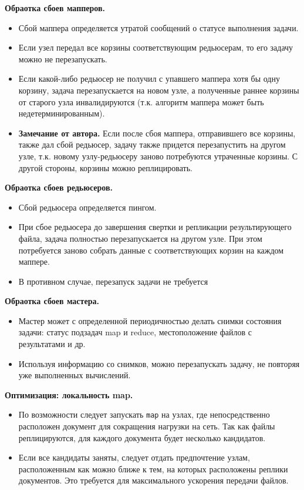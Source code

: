 \textbf{Обраотка сбоев мапперов.}
\begin{itemize}
  \item Сбой маппера определяется утратой сообщений о статусе выполнения задачи.
  \item Если узел передал все корзины соответствующим редьюсерам, то его задачу
    можно не перезапускать.
  \item Если какой-либо редьюсер не получил с упавшего маппера хотя бы одну
    корзину, задача перезапускается на новом узле, а полученные раннее корзины
    от старого узла инвалидируются (т.к. алгоритм маппера может быть
    недетерминированным).
  \item  \textbf{Замечание от автора.} Если после сбоя маппера, отправившего все
    корзины, также дал сбой редьюсер, задачу также придется перезапустить на
    другом узле, т.к. новому узлу-редьюсеру заново потребуются утраченные
    корзины. С другой стороны, корзины можно реплицировать.
\end{itemize}

\textbf{Обраотка сбоев редьюсеров.}
\begin{itemize}
  \item Сбой редьюсера определяется пингом.
  \item При сбое редьюсера до завершения свертки и репликации результирующего
    файла, задача полностью перезапускается на другом узле. При этом потребуется
    заново собрать данные с соответствующих корзин на каждом маппере.
  \item В противном случае, перезапуск задачи не требуется
\end{itemize}

\textbf{Обраотка сбоев мастера.}
\begin{itemize}
  \item Мастер может с определенной периодичностью делать снимки состояния
    задачи: статус подзадач map и reduce, местоположение файлов с результатами
    и др.
  \item Используя информацию со снимков, можно перезапускать задачу,
    не повторяя уже выполненных вычислений.
\end{itemize}

\textbf{Оптимизация: локальность map.}
\begin{itemize}
  \item По возможности следует запускать \texttt{map} на узлах, где
    непосредственно расположен документ для сокращения нагрузки на сеть. Так как
    файлы реплицируются, для каждого документа будет несколько кандидатов.
  \item Если все кандидаты заняты, следует отдать предпочтение узлам,
    расположенным как можно ближе к тем, на которых расположены реплики
    документов. Это требуется для максимального ускорения передачи файлов.
\end{itemize}

